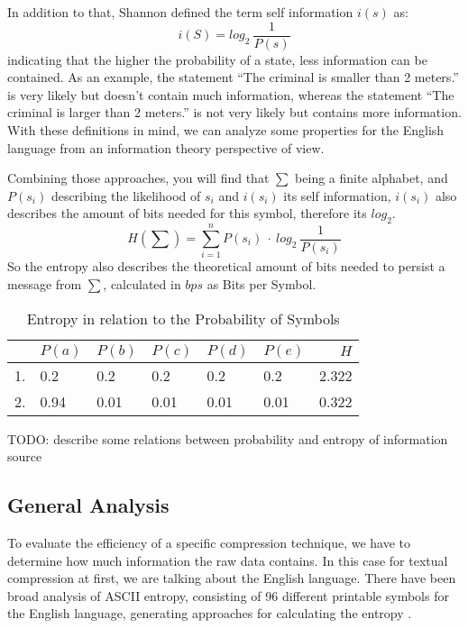 \par{
In addition to that, Shannon defined the term self information $i(s)$ as:
\[
i(S) = log_{2} \: \frac{1}{P(s)}
\]
indicating that the higher the probability of a state, less information can be contained. As an example, the statement \enquote{The criminal is smaller than 2 meters.} is very likely but doesn't contain much information, whereas the statement \enquote{The criminal is larger than 2 meters.} is not very likely but contains more information. With these definitions in mind, we can analyze some properties for the English language from an information theory perspective of view.
}

\par{
Combining those approaches, you will find that $\sum$ being a finite alphabet, and $P(s_i)$ describing the likelihood of $s_i$ and $i(s_i)$ its self information, $i(s_i)$ also describes the amount of bits needed for this symbol, therefore its $log_2$.
\[
	H(\sum) = \sum_{i = 1}^{n} P(s_i) \: \cdot \: log_{2} \: \frac{1}{P(s_i) }
\]
So the entropy 	also describes the theoretical amount of bits needed to persist a message from $\sum$, calculated in $bps$ as Bits per Symbol.

\begin{table}
	\centering
\begin{tabular}[p]{l|l|l|l|l|l|r}
	& $P(a)$ & $P(b)$ & $P(c)$ & $P(d)$ & $P(e)$ & $H$ \\
	\hline
	1. & 0.2 & 0.2 & 0.2 & 0.2 & 0.2 & 2.322 \\
	2. & 0.94 & 0.01 & 0.01 & 0.01 & 0.01 & 0.322
	\label{tab:heisetabelle}
\end{tabular}
	\caption{Entropy in relation to the Probability of Symbols}
\end{table}


TODO: describe some relations between probability and entropy of information source
}
\subsection{General Analysis}
\par{
To evaluate the efficiency of a specific compression technique, we have to determine how much information the raw data contains. In this case for textual compression at first, we are talking about the English language. There have been broad analysis of ASCII entropy, consisting of 96 different printable symbols for the English language, generating approaches for calculating the entropy \cite{entropy-fernau}.
}

